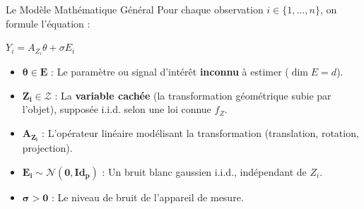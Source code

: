 \begin{frame}{Le Modèle Mathématique Général}
    Pour chaque observation $i \in \{1, \dots, n\}$, on formule l'équation :
    
    \begin{center}
        \Large \alert{$Y_i = A_{Z_i}\theta + \sigma E_i$}
    \end{center}
    
    \vspace{0.4cm}
    \begin{itemize}
        \item $\mathbf{\theta \in E}$ : Le paramètre ou signal d'intérêt \textbf{inconnu} à estimer ($\dim E = d$).
        \item $\mathbf{Z_i \in \mathcal{Z}}$ : La \textbf{variable cachée} (la transformation géométrique subie par l'objet), supposée i.i.d. selon une loi connue $f_Z$.
        \item $\mathbf{A_{Z_i}}$ : L'opérateur linéaire modélisant la transformation (translation, rotation, projection).
        \item $\mathbf{E_i \sim \mathcal{N}(0, \text{Id}_p)}$ : Un bruit blanc gaussien i.i.d., indépendant de $Z_i$.
        \item $\mathbf{\sigma > 0}$ : Le niveau de bruit de l'appareil de mesure.
    \end{itemize}
\end{frame}